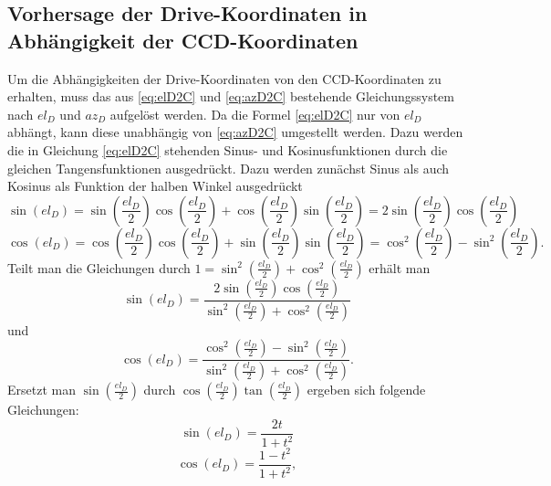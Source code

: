 \subsection{Vorhersage der Drive-Koordinaten in Abhängigkeit der CCD-Koordinaten}
Um die Abhängigkeiten der Drive-Koordinaten von den CCD-Koordinaten zu erhalten, muss das aus \ref{eq:elD2C} und \ref{eq:azD2C} bestehende Gleichungssystem nach $el_D$ und $az_D$ aufgelöst werden. Da die Formel \ref{eq:elD2C} nur von $el_D$ abhängt, kann diese unabhängig von \ref{eq:azD2C} umgestellt werden. Dazu werden die in Gleichung \ref{eq:elD2C} stehenden Sinus- und Kosinusfunktionen durch die gleichen Tangensfunktionen ausgedrückt. Dazu werden zunächst Sinus als auch Kosinus als Funktion der halben Winkel ausgedrückt
\begin{equation}
\sin\left( el_D \right) = \sin\left( \frac{el_D}{2} \right)\cos\left( \frac{el_D}{2} \right)+\cos\left( \frac{el_D}{2} \right)\sin\left( \frac{el_D}{2} \right)=2\sin\left( \frac{el_D}{2} \right)\cos\left( \frac{el_D}{2} \right)
\end{equation}
\begin{equation}
\cos\left( el_D \right) = \cos\left( \frac{el_D}{2} \right)\cos\left( \frac{el_D}{2} \right)+\sin\left( \frac{el_D}{2} \right)\sin\left( \frac{el_D}{2} \right)=\cos^2\left( \frac{el_D}{2} \right)-\sin^2\left( \frac{el_D}{2} \right).
\end{equation}
Teilt man die Gleichungen durch $1=\sin^2\left( \frac{el_D}{2} \right)+\cos^2\left( \frac{el_D}{2} \right)$ erhält man
\begin{equation}
\sin\left( el_D \right)=\frac{2\sin\left( \frac{el_D}{2} \right)\cos\left( \frac{el_D}{2} \right)}{\sin^2\left( \frac{el_D}{2} \right)+\cos^2\left( \frac{el_D}{2} \right)}
\end{equation}
und
\begin{equation}
\cos\left( el_D \right)=\frac{\cos^2\left( \frac{el_D}{2} \right)-\sin^2\left( \frac{el_D}{2} \right)}{\sin^2\left( \frac{el_D}{2} \right)+\cos^2\left( \frac{el_D}{2} \right)}.
\end{equation}
Ersetzt man $\sin\left(\frac{el_D}{2}\right)$ durch $\cos\left(\frac{el_D}{2}\right)\tan\left(\frac{el_D}{2}\right)$ ergeben sich folgende Gleichungen:
\begin{equation}
\sin\left(el_D\right)=\frac{2t}{1+t^2}
\label{eq:sint}
\end{equation}
\begin{equation}
\cos\left(el_D\right)=\frac{1-t^2}{1+t^2},
\label{eq:cost}
\end{equation}
